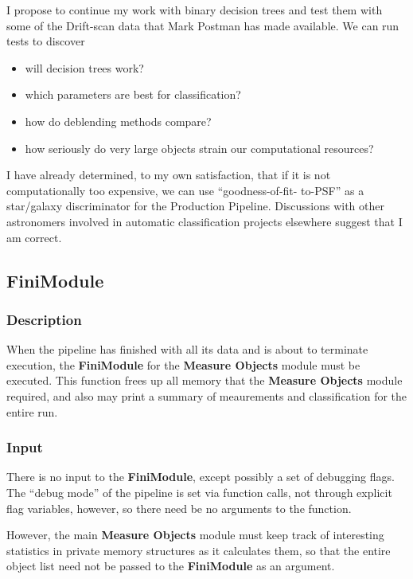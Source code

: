   I propose to continue my work with binary decision trees and
test them with some of the Drift-scan data that Mark Postman has
made available.  We can run tests to discover
 
\begin {itemize}
     \item will decision trees work?
     \item which parameters are best for classification?
     \item how do deblending methods compare?
     \item how seriously do very large objects strain
              our computational resources?
\end {itemize}

  I have already determined, to my own satisfaction, that if it
is not computationally too expensive, we can use ``goodness-of-fit-
to-PSF'' as a star/galaxy discriminator for the Production Pipeline.
Discussions with other astronomers involved in automatic
classification projects elsewhere suggest that I am correct.

\subsection {FiniModule}

\subsubsection {Description}

  When the pipeline has finished with all its data and is about to
terminate execution, the {\bf FiniModule} for the {\bf Measure Objects}
module must be executed.  This function frees up all memory that
the {\bf Measure Objects} module required, and also may print a
summary of meaurements and classification for the entire run.

\subsubsection {Input}

  There is no input to the {\bf FiniModule}, except possibly
a set of debugging flags.  The ``debug mode''
of the pipeline is set via function calls, not through
explicit flag variables, however, so there need be no
arguments to the function. 

  However, the main {\bf Measure Objects} module must
keep track of interesting statistics in private memory
structures as it calculates them, so that the entire
object list need not be passed to the {\bf FiniModule}
as an argument.

